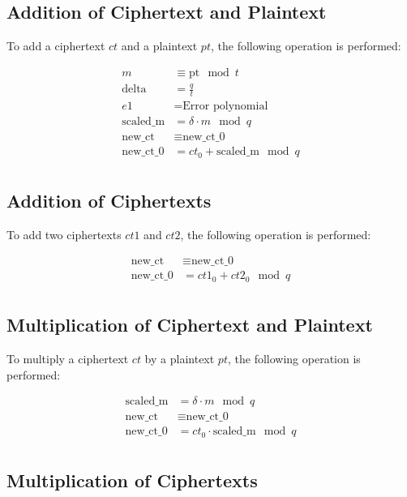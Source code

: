 \documentclass{article}
\begin{document}
\subsection{Addition of Ciphertext and Plaintext}

To add a ciphertext $ct$ and a plaintext $pt$, the following operation is performed:

\begin{align*}
    m &\equiv \text{pt} \mod t \\
    \text{delta} &= \frac{q}{t} \\
    e1 &= \text{Error polynomial} \\
    \text{scaled\_m} &= \delta \cdot m \mod q \\
    \text{new\_ct} &\equiv \text{new\_ct\_0} \\
    \text{new\_ct\_0} &= ct_0 + \text{scaled\_m} \mod q \\
\end{align*}

\subsection{Addition of Ciphertexts}

To add two ciphertexts $ct1$ and $ct2$, the following operation is performed:

\begin{align*}
    \text{new\_ct} &\equiv \text{new\_ct\_0} \\
    \text{new\_ct\_0} &= ct1_0 + ct2_0 \mod q \\
\end{align*}

\subsection{Multiplication of Ciphertext and Plaintext}

To multiply a ciphertext $ct$ by a plaintext $pt$, the following operation is performed:

\begin{align*}
    \text{scaled\_m} &= \delta \cdot m \mod q \\
    \text{new\_ct} &\equiv \text{new\_ct\_0} \\
    \text{new\_ct\_0} &= ct_0 \cdot \text{scaled\_m} \mod q \\
\end{align*}

\subsection{Multiplication of Ciphertexts}
\end{document}

